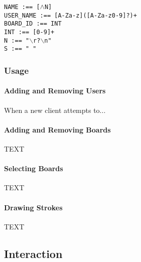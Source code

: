 \texttt{NAME :== [$\wedge$N]}\\
\texttt{USER\_NAME :== [A-Za-z]([A-Za-z0-9]?)+}\\
\texttt{BOARD\_ID :== INT}\\

\texttt{INT :== [0-9]+}\\
\texttt{N :== "$\backslash$r?$\backslash$n"}\\
\texttt{S :== " "}\\

\setlength{\parindent}{15pt} %

\subsubsection{Usage}

\paragraph{Adding and Removing Users} When a new client attempts to...

\paragraph{Adding and Removing Boards} TEXT

\paragraph{Selecting Boards} TEXT

\paragraph{Drawing Strokes} TEXT

\subsection{Interaction}